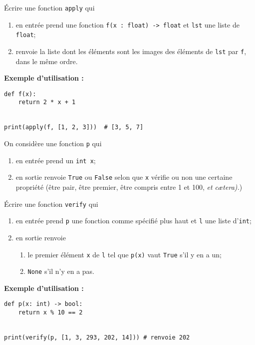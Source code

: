 \documentclass[a4paper,12pt,french]{article}
\begin{document}

\begin{exercice}
	\'Ecrire une fonction \texttt{apply} qui
\begin{enumerate}[--]
	\item 	en entrée prend une fonction \texttt{f(x : float) -> float} et \texttt{lst} une liste de \texttt{float};
	\item 	renvoie la liste dont les éléments sont les images des éléments de \texttt{lst} par \texttt{f}, dans le même ordre.
\end{enumerate}
\textbf{Exemple d'utilisation :}
\begin{verbatim}
def f(x):
    return 2 * x + 1


print(apply(f, [1, 2, 3]))  # [3, 5, 7]
\end{verbatim}

\end{exercice}

\begin{exercice}
	On considère une fonction \texttt{p} qui
	\begin{enumerate}[--]
		\item 	en entrée prend un \texttt{int x};
		\item 	en sortie renvoie \texttt{True} ou \texttt{False} selon que \texttt{x} vérifie ou non une certaine propriété (être pair, être premier, être compris entre 1 et 100, \textit{et c\ae tera).})
	\end{enumerate}
	\'Ecrire une fonction \texttt{verify} qui
\begin{enumerate}[--]
	\item 	en entrée prend \texttt{p} une fonction comme spécifié plus haut et \texttt{l} une liste d'\texttt{int};
	\item 	en sortie renvoie
		\begin{enumerate}[--]
			\item 	le premier élément \texttt{x} de \texttt{l} tel que \texttt{p(x)} vaut \texttt{True} s'il y en a un;
			\item 	\texttt{None} s'il n'y en a pas.	
		\end{enumerate} 
\end{enumerate}
\textbf{Exemple d'utilisation :}
\begin{verbatim}
def p(x: int) -> bool:
    return x % 10 == 2


print(verify(p, [1, 3, 293, 202, 14])) # renvoie 202
\end{verbatim}
\end{exercice}
\end{document}

